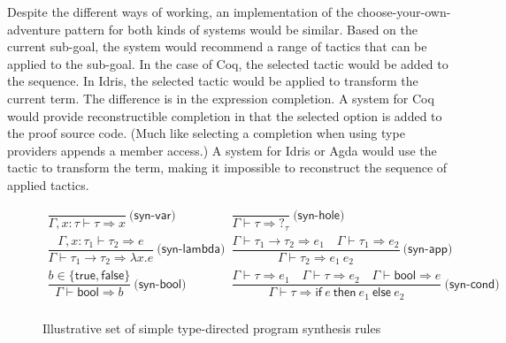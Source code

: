 \documentclass[ a4paper,UKenglish,cleveref, autoref, thm-restate]{lipics-v2021}
\newcommand{\ident}[1]{\textsf{#1}}
\begin{document}
Despite the different ways of working, an implementation of the choose-your-own-adventure
pattern for both kinds of systems would be similar. Based on the current sub-goal, the system
would recommend a range of tactics that can be applied to the sub-goal. In the
case of Coq, the selected tactic would be added to the sequence. In Idris, the selected tactic
would be applied to transform the current term. The difference is in the expression completion.
A system for Coq would provide reconstructible completion in that the selected option is added
to the proof source code. (Much like selecting a completion when using type providers appends a
member access.) A system for Idris or Agda would use the tactic to transform the term,
making it impossible to reconstruct the sequence of applied tactics.

\begin{figure}
\vspace{-1.5em}
\[
\begin{array}{lcl}
\dfrac{}{\Gamma,x:\tau \vdash \tau \Rightarrow x}~\ident{(syn-var)} &\quad&
\dfrac{}{\Gamma \vdash \tau \Rightarrow ?_\tau}~\ident{(syn-hole)}\\[2em]
\dfrac{\Gamma,x:\tau_1\vdash \tau_2 \Rightarrow e}{\Gamma \vdash \tau_1 \rightarrow \tau_2 \Rightarrow \lambda x.e}~\ident{(syn-lambda)}&&
\dfrac{\Gamma \vdash \tau_1\rightarrow\tau_2 \Rightarrow e_1 \quad \Gamma \vdash \tau_1 \Rightarrow e_2}{\Gamma \vdash \tau_2 \Rightarrow e_1~e_2}~\ident{(syn-app)}\\[2em]
\dfrac{b\in \{\ident{true},\ident{false}\} }{\Gamma \vdash \ident{bool} \Rightarrow b}~\ident{(syn-bool)} &\quad&
\dfrac{\Gamma \vdash \tau \Rightarrow e_1 \quad \Gamma \vdash \tau \Rightarrow e_2 \quad \Gamma \vdash \ident{bool} \Rightarrow e}{\Gamma \vdash \tau \Rightarrow \ident{if}~e~\ident{then}~e_1~\ident{else}~e_2}~\ident{(syn-cond)}\\
\end{array}
\]
\vspace{-0.25em}
\caption{Illustrative set of simple type-directed program synthesis rules}
\label{fig:synths}
\vspace{-0.25em}
\end{figure}
\end{document}
